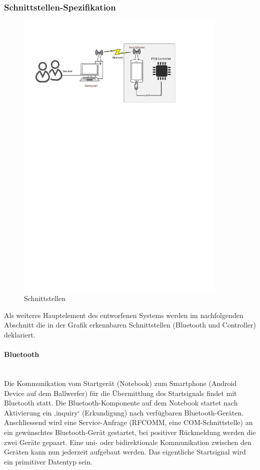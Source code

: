 	\subsubsection{Schnittstellen-Spezifikation}
		\begin{figure}[h!]
			\centering
			\includegraphics[width=0.9\textwidth,clip,trim= 12mm 205mm 43mm 24mm]
			{Enddokumentation/Loesungskonzept/Bilder/Schnittstellen.pdf}
			\caption{Schnittstellen}		
		\end{figure}
		Als weiteres Hauptelement des entworfenen Systems werden im nachfolgenden Abschnitt die in der Grafik erkennbaren Schnittstellen (Bluetooth und Controller) deklariert.
		\newpage
		\paragraph{Bluetooth}$~~$\vspace{2mm}\\
		Die Kommunikation vom Startgerät (Notebook) zum Smartphone (Android Device auf dem Ballwerfer) für die Übermittlung des Startsignals findet mit Bluetooth statt. Die Bluetooth-Komponente auf dem Notebook startet nach Aktivierung ein ‚inquiry‘ (Erkundigung) nach verfügbaren Bluetooth-Geräten. Anschliessend wird eine Service-Anfrage (RFCOMM, eine COM-Schnittstelle) an ein gewünschtes Bluetooth-Gerät gestartet, bei positiver Rückmeldung werden die zwei Geräte gepaart. Eine uni- oder bidirektionale Kommunikation zwischen den Geräten kann nun jederzeit aufgebaut werden. Das eigentliche Startsignal wird ein primitiver Datentyp sein.
		
